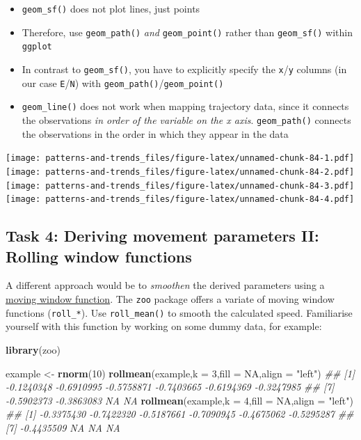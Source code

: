 \documentclass[]{book}
\newenvironment{Shaded}{\begin{snugshade}}{\end{snugshade}}
\newcommand{\CommentTok}[1]{\textcolor[rgb]{0.56,0.35,0.01}{\textit{#1}}}
\newcommand{\DataTypeTok}[1]{\textcolor[rgb]{0.13,0.29,0.53}{#1}}
\newcommand{\DecValTok}[1]{\textcolor[rgb]{0.00,0.00,0.81}{#1}}
\newcommand{\KeywordTok}[1]{\textcolor[rgb]{0.13,0.29,0.53}{\textbf{#1}}}
\newcommand{\NormalTok}[1]{#1}
\newcommand{\OtherTok}[1]{\textcolor[rgb]{0.56,0.35,0.01}{#1}}
\newcommand{\StringTok}[1]{\textcolor[rgb]{0.31,0.60,0.02}{#1}}
\providecommand{\tightlist}{%
  \setlength{\itemsep}{0pt}\setlength{\parskip}{0pt}}
\begin{document}
\begin{itemize}
\tightlist
\item
  \texttt{geom\_sf()} does not plot lines, just points
\item
  Therefore, use \texttt{geom\_path()} \emph{and} \texttt{geom\_point()} rather than \texttt{geom\_sf()} within \texttt{ggplot}
\item
  In contrast to \texttt{geom\_sf()}, you have to explicitly specify the \texttt{x}/\texttt{y} columns (in our case \texttt{E}/\texttt{N}) with \texttt{geom\_path()}/\texttt{geom\_point()}
\item
  \texttt{geom\_line()} does not work when mapping trajectory data, since it connects the observations \emph{in order of the variable on the x axis}. \texttt{geom\_path()} connects the observations in the order in which they appear in the data
\end{itemize}

\texttt{[image: patterns-and-trends\_files/figure-latex/unnamed-chunk-84-1.pdf]} \texttt{[image: patterns-and-trends\_files/figure-latex/unnamed-chunk-84-2.pdf]} \texttt{[image: patterns-and-trends\_files/figure-latex/unnamed-chunk-84-3.pdf]} \texttt{[image: patterns-and-trends\_files/figure-latex/unnamed-chunk-84-4.pdf]}

\hypertarget{task-4-deriving-movement-parameters-ii-rolling-window-functions}{%
\subsection{Task 4: Deriving movement parameters II: Rolling window functions}\label{task-4-deriving-movement-parameters-ii-rolling-window-functions}}

A different approach would be to \emph{smoothen} the derived parameters using a \href{https://docs.wavefront.com/images/5sec_moving_window.png}{moving window function}. The \texttt{zoo} package offers a variate of moving window functions (\texttt{roll\_*}). Use \texttt{roll\_mean()} to smooth the calculated speed. Familiarise yourself with this function by working on some dummy data, for example:

\begin{Shaded}
\begin{Highlighting}[]

\KeywordTok{library}\NormalTok{(zoo)}

\NormalTok{example <-}\StringTok{ }\KeywordTok{rnorm}\NormalTok{(}\DecValTok{10}\NormalTok{)}
\KeywordTok{rollmean}\NormalTok{(example,}\DataTypeTok{k =} \DecValTok{3}\NormalTok{,}\DataTypeTok{fill =} \OtherTok{NA}\NormalTok{,}\DataTypeTok{align =} \StringTok{"left"}\NormalTok{)}
\CommentTok{##  [1] -0.1240348 -0.6910995 -0.5758871 -0.7403665 -0.6194369 -0.3247985}
\CommentTok{##  [7] -0.5902373 -0.3863083         NA         NA}
\KeywordTok{rollmean}\NormalTok{(example,}\DataTypeTok{k =} \DecValTok{4}\NormalTok{,}\DataTypeTok{fill =} \OtherTok{NA}\NormalTok{,}\DataTypeTok{align =} \StringTok{"left"}\NormalTok{)}
\CommentTok{##  [1] -0.3375430 -0.7422320 -0.5187661 -0.7090945 -0.4675062 -0.5295287}
\CommentTok{##  [7] -0.4435509         NA         NA         NA}
\end{Highlighting}
\end{Shaded}
\end{document}
